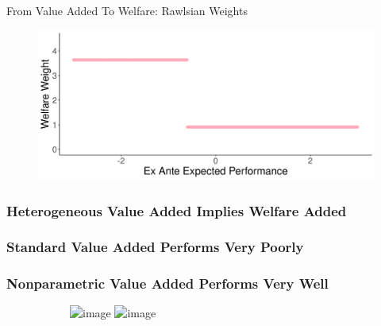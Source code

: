 \documentclass[t,aspectratio=169,11pt]{beamer}
\begin{document}
\begin{frame}{From Value Added To Welfare: Rawlsian  Weights}
\vfill
\begin{figure}
    \centering
\includegraphics[width=.85\linewidth]{slides/CIERS_Figures/weight_example_1.png}
\end{figure}
\end{frame}



\begin{frame}
\frametitle<1>{Heterogeneous Value Added Implies Welfare Added}
\frametitle<2>{Standard Value Added Performs Very Poorly}
\frametitle<3>{Nonparametric Value Added Performs Very Well}
\vfill

\begin{figure}
\centering
\begin{subfigure}{.5\textwidth}
  \centering
  \includegraphics<1>[width=\linewidth]{slides/CIERS_Figures/truth_cat_run_2.png}
  \includegraphics<2->[width=\linewidth]{slides/CIERS_Figures/standard_cat_run_2.png}
\end{subfigure}%
\begin{subfigure}{.5\textwidth}
  \centering
\end{subfigure}
\end{figure}

\end{frame}
\end{document}
